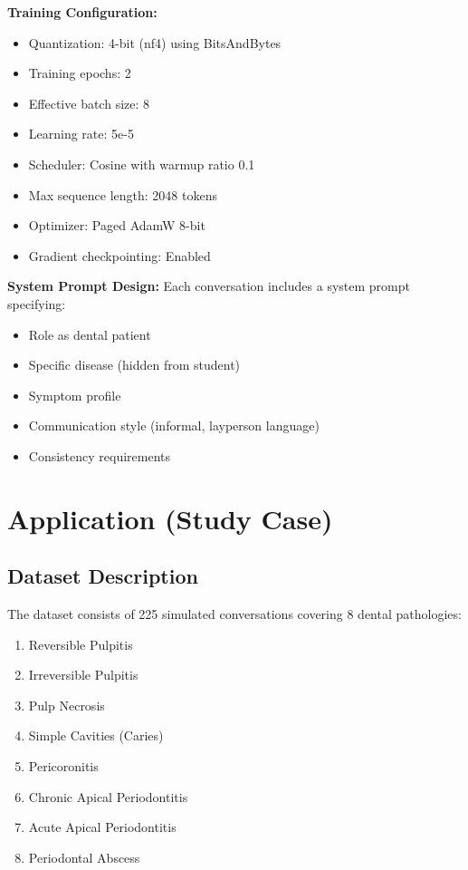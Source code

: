 \documentclass[runningheads,a4paper,11pt]{report}
\begin{document}
\textbf{Training Configuration:}
\begin{itemize}
\item Quantization: 4-bit (nf4) using BitsAndBytes
\item Training epochs: 2
\item Effective batch size: 8
\item Learning rate: 5e-5
\item Scheduler: Cosine with warmup ratio 0.1
\item Max sequence length: 2048 tokens
\item Optimizer: Paged AdamW 8-bit
\item Gradient checkpointing: Enabled
\end{itemize}

\textbf{System Prompt Design:} Each conversation includes a system prompt specifying:
\begin{itemize}
\item Role as dental patient
\item Specific disease (hidden from student)
\item Symptom profile
\item Communication style (informal, layperson language)
\item Consistency requirements
\end{itemize}

\chapter{Application (Study Case)}
\label{chapter:application}

\section{Dataset Description}

The dataset consists of 225 simulated conversations covering 8 dental pathologies:
\begin{enumerate}
\item Reversible Pulpitis
\item Irreversible Pulpitis
\item Pulp Necrosis
\item Simple Cavities (Caries)
\item Pericoronitis
\item Chronic Apical Periodontitis
\item Acute Apical Periodontitis
\item Periodontal Abscess
\end{enumerate}
\end{document}
